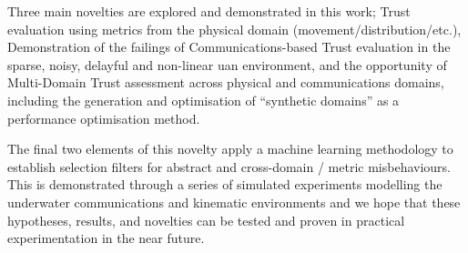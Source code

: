 Three main novelties are explored and demonstrated in this work;
Trust evaluation using metrics from the physical domain (movement/distribution/etc.),
Demonstration of the failings of Communications-based Trust evaluation in the sparse, noisy, delayful and non-linear \gls{uan} environment, and the opportunity of
Multi-Domain Trust assessment across physical and communications domains, including the generation and optimisation of ``synthetic domains'' as a performance optimisation method.

The final two elements of this novelty apply a machine learning methodology to establish selection filters for abstract and cross-domain / metric misbehaviours.
This is demonstrated through a series of simulated experiments modelling the underwater communications and kinematic environments and we hope that these hypotheses, results, and novelties can be tested and proven in practical experimentation in the near future.